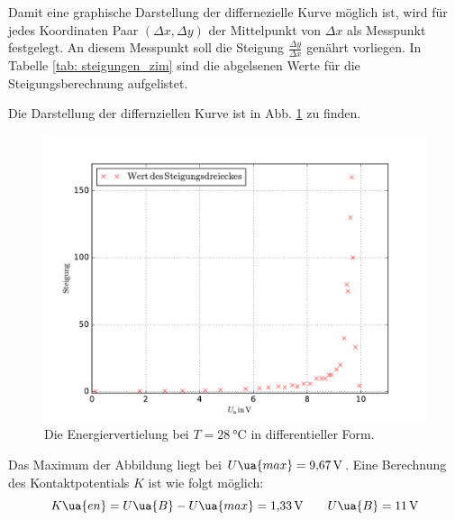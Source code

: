 Damit eine graphische Darstellung der differnezielle Kurve möglich ist, wird für jedes Koordinaten Paar $(\Delta x,\Delta y)$ der Mittelpunkt
von $\Delta x$ als Messpunkt festgelegt. An diesem Messpunkt soll die Steigung $\frac{\Delta y}{\Delta x}$ genährt vorliegen.
In Tabelle \ref{tab: steigungen_zim} sind die abgelsenen Werte für die Steigungsberechnung aufgelistet.

Die Darstellung der differnziellen Kurve ist in Abb. \ref{fig: energie_zim_diff} zu finden.
\begin{figure}
  \centering
  \includegraphics[width=0.8 \textwidth]{../Messdaten/energie_zim.pdf}
  \caption{Die Energiervertielung bei $T=\SI{28}{\celsius}$ in differentieller Form.}
  \label{fig: energie_zim_diff}
\end{figure}
Das Maximum der Abbildung liegt bei $U\ua{max}=\SI{9.67}{\volt}$.
Eine Berechnung des Kontaktpotentials $K$ ist wie folgt möglich:
\begin{equation}
\label{eq:k_energie_zim}
  K\ua{en}=U\ua{B}-U\ua{max}=\SI{1.33}{\volt} \qquad U\ua{B}=\SI{11}{\volt}
\end{equation}
\FloatBarrier
